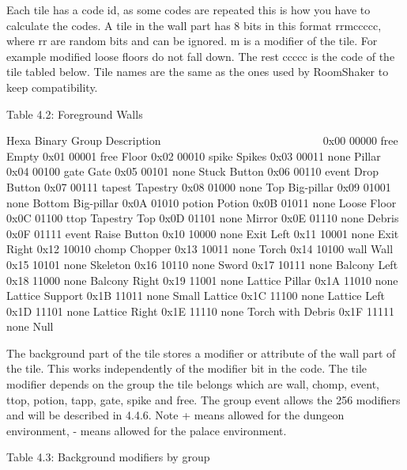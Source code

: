  Each tile has a code id, as some codes are repeated this is how you have
 to calculate the codes. A tile in the wall part has 8 bits in this format
 rrmccccc, where rr are random bits and can be ignored. m is a modifier of
 the tile. For example modified loose floors do not fall down. The rest
 ccccc is the code of the tile tabled below. Tile names are the same as the
 ones used by RoomShaker to keep compatibility.

                   Table 4.2: Foreground Walls
                   ~~~~~~~~~~~~~~~~~~~~~~~~~~~

  Hexa Binary Group  Description
  ~~~~ ~~~~~~ ~~~~~  ~~~~~~~~~~~
  0x00 00000  free   Empty
  0x01 00001  free   Floor
  0x02 00010  spike  Spikes
  0x03 00011  none   Pillar
  0x04 00100  gate   Gate
  0x05 00101  none   Stuck Button
  0x06 00110  event  Drop Button
  0x07 00111  tapest Tapestry
  0x08 01000  none   Top Big-pillar
  0x09 01001  none   Bottom Big-pillar
  0x0A 01010  potion Potion
  0x0B 01011  none   Loose Floor
  0x0C 01100  ttop   Tapestry Top
  0x0D 01101  none   Mirror
  0x0E 01110  none   Debris
  0x0F 01111  event  Raise Button
  0x10 10000  none   Exit Left
  0x11 10001  none   Exit Right
  0x12 10010  chomp  Chopper
  0x13 10011  none   Torch
  0x14 10100  wall   Wall
  0x15 10101  none   Skeleton
  0x16 10110  none   Sword
  0x17 10111  none   Balcony Left
  0x18 11000  none   Balcony Right
  0x19 11001  none   Lattice Pillar
  0x1A 11010  none   Lattice Support
  0x1B 11011  none   Small Lattice
  0x1C 11100  none   Lattice Left
  0x1D 11101  none   Lattice Right
  0x1E 11110  none   Torch with Debris
  0x1F 11111  none   Null

 The background part of the tile stores a modifier or attribute of the
 wall part of the tile. This works independently of the modifier bit in the
 code. The tile  modifier depends on the group the tile belongs which are
 wall, chomp, event, ttop, potion, tapp, gate, spike and free.
 The group event allows the 256 modifiers and will be described in 4.4.6.
 Note + means allowed for the dungeon environment, - means allowed for the
 palace environment.

                   Table 4.3: Background modifiers by group
                   ~~~~~~~~~~~~~~~~~~~~~~~~~~~~~~~~~~~~~~~~

